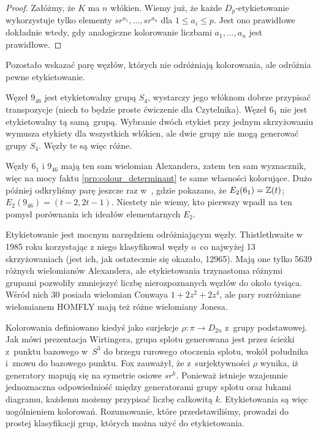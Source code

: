 \begin{proof}
    Załóżmy, że $K$ ma $n$ włókien.
    Wiemy już, że każde $D_p$-etykietowanie wykorzystuje tylko elementy $sr^{a_1}, \ldots, sr^{a_n}$ dla $1 \le a_i \le p$.
    Jest ono prawidłowe dokładnie wtedy, gdy analogiczne kolorowanie liczbami $a_1, \ldots, a_n$ jest prawidłowe.
\end{proof}

Pozostało wskazać parę węzłów, których nie odróżniają kolorowania, ale odróżnia pewne etykietowanie.

\begin{example}
    Węzeł $9_{46}$ jest etykietowalny grupą $S_4$, wystarczy jego włóknom dobrze przypisać transpozycje (niech to będzie proste ćwiczenie dla Czytelnika).
    Węzeł $6_1$ nie jest etykietowalny tą samą grupą.
    Wybranie dwóch etykiet przy jednym skrzyżowaniu wymusza etykiety dla wszystkich włókien, ale dwie grupy nie mogą generować grupy $S_4$.
    Węzły te są więc różne.
\end{example}

Węzły $6_1$ i $9_{46}$ mają ten sam wielomian Alexandera, zatem ten sam wyznacznik, więc na mocy faktu \ref{prp:colour_determinant} te same własności kolorujące.
%
Dużo później odkryliśmy parę jeszcze raz w~\cite[s. 138]{burde2014}, gdzie pokazano, że  $E_2(6_1) = \mathbb Z(t)$; $E_2(9_{46}) = (t-2, 2t-1)$.
Niestety nie wiemy, kto pierwszy wpadł na ten pomysł porównania ich ideałów elementarnych $E_2$. 

Etykietowanie jest mocnym narzędziem odróżniającym węzły.
Thistlethwaite w 1985 roku korzystając z niego klasyfikował węzły o~co najwyżej 13 skrzyżowaniach (jest ich, jak ostatecznie się okazało, 12965).
%
Mają one tylko 5639 różnych wielomianów Alexandera, ale etykietowania trzynastoma różnymi grupami pozwoliły zmniejszyć liczbę nierozpoznanych węzłów do około tysiąca.
Wśród nich 30 posiada wielomian Conwaya $1 + 2z^2 + 2z^4$, ale pary rozróżniane wielomianem HOMFLY mają też różne wielomiany Jonesa.

Kolorowania definiowano kiedyś jako surjekcje $\rho \colon \pi \to D_{2n}$ z~grupy podstawowej.
Jak mówi prezentacja Wirtingera, grupa splotu generowana jest przez ścieżki z~punktu bazowego w~$S^3$ do brzegu rurowego otoczenia splotu, wokół południka i~znowu do bazowego punktu.
%
Fox zauważył, że z~surjektywności $\rho$ wynika, iż generatory mapują się na symetrie osiowe $sr^k$.
Ponieważ istnieje wzajemnie jednoznaczna odpowiedniość między generatorami grupy splotu oraz łukami diagramu, każdemu możemy przypisać liczbę całkowitą $k$.
Etykietowania są więc uogólnieniem kolorowań.
Rozumowanie, które przedstawiliśmy, prowadzi do prostej klasyfikacji grup, których można użyć do etykietowania.


